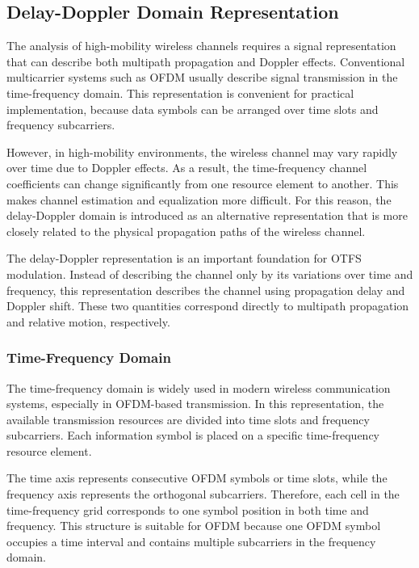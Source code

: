 \subsection{Delay-Doppler Domain Representation}

The analysis of high-mobility wireless channels requires a signal representation that can describe both multipath propagation and Doppler effects. Conventional multicarrier systems such as OFDM usually describe signal transmission in the time-frequency domain. This representation is convenient for practical implementation, because data symbols can be arranged over time slots and frequency subcarriers.

However, in high-mobility environments, the wireless channel may vary rapidly over time due to Doppler effects. As a result, the time-frequency channel coefficients can change significantly from one resource element to another. This makes channel estimation and equalization more difficult. For this reason, the delay-Doppler domain is introduced as an alternative representation that is more closely related to the physical propagation paths of the wireless channel.

The delay-Doppler representation is an important foundation for OTFS modulation. Instead of describing the channel only by its variations over time and frequency, this representation describes the channel using propagation delay and Doppler shift. These two quantities correspond directly to multipath propagation and relative motion, respectively.

\subsubsection{Time-Frequency Domain}

The time-frequency domain is widely used in modern wireless communication systems, especially in OFDM-based transmission. In this representation, the available transmission resources are divided into time slots and frequency subcarriers. Each information symbol is placed on a specific time-frequency resource element.

The time axis represents consecutive OFDM symbols or time slots, while the frequency axis represents the orthogonal subcarriers. Therefore, each cell in the time-frequency grid corresponds to one symbol position in both time and frequency. This structure is suitable for OFDM because one OFDM symbol occupies a time interval and contains multiple subcarriers in the frequency domain.

